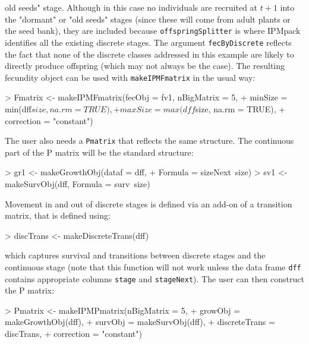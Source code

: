\documentclass{article}
\begin{document}
old seeds" stage. Although in this case no individuals are recruited at $t+1$
into the "dormant" or "old seeds" stages (since these will come from adult
plants or the seed bank), they are included because {\tt offspringSplitter} is
where IPMpack identifies all the existing discrete stages. The argument {\tt fecByDiscrete} reflects the fact that none of the discrete classes addressed in this example are likely to directly produce offspring (which may not always be the case). The resulting fecundity object can be used with {\tt makeIPMFmatrix} in the usual way:
\begin{Schunk}
\begin{Sinput}
> Fmatrix <- makeIPMFmatrix(fecObj = fv1, nBigMatrix = 5, 
+                             minSize = min(dff$size, na.rm = TRUE), 
+                             maxSize = max(dff$size, na.rm = TRUE), 
+                             correction = "constant")
\end{Sinput}
\end{Schunk}
The user also needs a {\tt Pmatrix} that reflects the same structure. The
continuous part of the P matrix will be the standard structure:
\begin{Schunk}
\begin{Sinput}
> gr1 <- makeGrowthObj(dataf = dff, 
+                       Formula = sizeNext~size)
> sv1 <- makeSurvObj(dff,  Formula = surv~size)
\end{Sinput}
\end{Schunk}
Movement in and out of discrete stages is defined via an add-on of a transition matrix, that is defined using: 
\begin{Schunk}
\begin{Sinput}
> discTrans <- makeDiscreteTrans(dff)
\end{Sinput}
\end{Schunk}
which captures survival and transitions between discrete stages and the
continuous stage (note that this function will not work unless the data frame
{\tt dff} contains appropriate columns {\tt stage} and {\tt stageNext}).  The
user can then construct the P matrix:
\begin{Schunk}
\begin{Sinput}
> Pmatrix <- makeIPMPmatrix(nBigMatrix = 5, 	
+                             growObj = makeGrowthObj(dff), 
+                             survObj = makeSurvObj(dff), 
+                             discreteTrans = discTrans, 
+                             correction = "constant")
\end{Sinput}
\end{Schunk}
\end{document}
